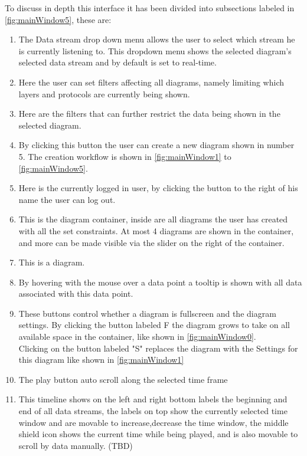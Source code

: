\documentclass[twoside, english, draft]{Pflichtenheft}
\begin{document}
To discuss in depth this interface it has been divided into subsections labeled in \autoref{fig:mainWindow5}, these are:
\\
\begin{enumerate}
	\item The Data stream drop down menu allows the user to select which stream he is currently listening to. This dropdown menu shows the selected diagram's selected data stream and by default is set to real-time.
	\item Here the user can set filters affecting all diagrams, namely limiting which layers and protocols are currently being shown.
	\item Here are the filters that can further restrict the data being shown in the selected diagram.
	\item By clicking this button the user can create a new diagram shown in number 5. The creation workflow is shown in \autoref{fig:mainWindow1} to \autoref{fig:mainWindow5}.
	\item Here is the currently logged in user, by clicking the button to the right of his name the user can log out.
	\item This is the \gls{diagram container}, inside are all diagrams the user has created with all the set constraints. At most 4 diagrams are shown in the container, and more can be made visible via the slider on the right of the container.
	\item This is a diagram.
	\item By hovering with the mouse over a data point a tooltip is shown with all data associated with this data point.
	\item These buttons control whether a diagram is fullscreen and the diagram settings. By clicking the button labeled F the diagram grows to take on all available space in the container, like shown in \autoref{fig:mainWindow0}.
	      \\
	      Clicking on the button labeled "S" replaces the diagram with the Settings for this diagram like shown in \autoref{fig:mainWindow1}
	\item The play button auto scroll along the selected time frame
	\item This timeline shows on the left and right bottom labels the beginning and end of all data streams, the labels on top show the currently selected time window and are movable to increase,decrease the time window, the middle shield icon shows the current time while being played, and is also movable to scroll by data manually. (TBD)

\end{enumerate}
\end{document}
